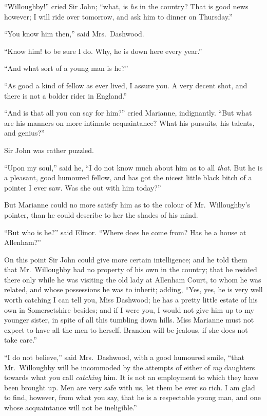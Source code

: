 \documentclass{article}
\begin{document}
``Willoughby!'' cried Sir John; ``what, is \emph{he}
in the country? That is good news however; I will
ride over tomorrow, and ask him to dinner on Thursday.''

``You know him then,'' said Mrs.\ Dashwood.

``Know him! to be sure I do.  Why, he is down here
every year.''

``And what sort of a young man is he?''

``As good a kind of fellow as ever lived, I assure you.
A very decent shot, and there is not a bolder rider
in England.''

``And is that all you can say for him?'' cried Marianne,
indignantly.  ``But what are his manners on more intimate
acquaintance? What his pursuits, his talents, and genius?''

Sir John was rather puzzled.

``Upon my soul,'' said he, ``I do not know much about him
as to all \emph{that}.  But he is a pleasant, good humoured fellow,
and has got the nicest little black bitch of a pointer
I ever saw.  Was she out with him today?''

But Marianne could no more satisfy him as to the
colour of Mr.\ Willoughby's pointer, than he could
describe to her the shades of his mind.

``But who is he?'' said Elinor.  ``Where does he come
from?  Has he a house at Allenham?''

On this point Sir John could give more certain intelligence;
and he told them that Mr.\ Willoughby had no property
of his own in the country; that he resided there only
while he was visiting the old lady at Allenham Court,
to whom he was related, and whose possessions he was
to inherit; adding, ``Yes, yes, he is very well worth
catching I can tell you, Miss Dashwood; he has a pretty
little estate of his own in Somersetshire besides;
and if I were you, I would not give him up to my
younger sister, in spite of all this tumbling down hills.
Miss Marianne must not expect to have all the men to herself.
Brandon will be jealous, if she does not take care.''

``I do not believe,'' said Mrs.\ Dashwood, with a
good humoured smile, ``that Mr.\ Willoughby will be incommoded
by the attempts of either of \emph{my} daughters towards what
you call \emph{catching} him.  It is not an employment to which
they have been brought up.  Men are very safe with us,
let them be ever so rich.  I am glad to find, however,
from what you say, that he is a respectable young man,
and one whose acquaintance will not be ineligible.''
\end{document}
